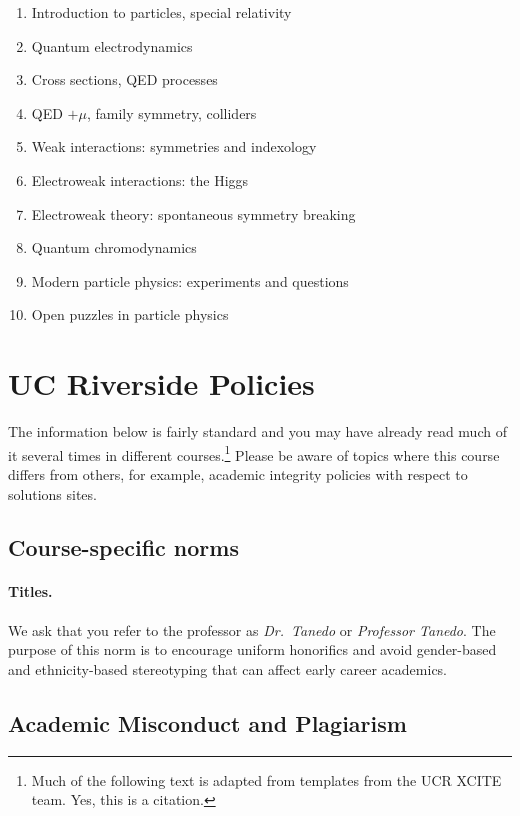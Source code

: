 \documentclass[12pt]{article}
\newcommand\acro[1]{{\small {#1}}}
\numberwithin{equation}{section}    %
\begin{document}
\begin{enumerate}
	\item Introduction to particles, special relativity
	\item Quantum electrodynamics
	\item Cross sections, QED processes
	\item QED $+ \mu$, family symmetry, colliders
	\item Weak interactions: symmetries and indexology
	\item Electroweak interactions: the Higgs
	\item Electroweak theory: spontaneous symmetry breaking
	\item Quantum chromodynamics
	\item Modern particle physics: experiments and questions
	\item Open puzzles in particle physics
\end{enumerate}




\section{UC Riverside Policies}

The information below is fairly standard and you may have already read much of it several times in different courses.\footnote{Much of the following text is adapted from templates from the \acro{UCR XCITE} team. Yes, this is a citation.} Please be aware of topics where this course differs from others, for example, academic integrity policies with respect to solutions sites. 

\subsection{Course-specific norms}

\paragraph{Titles.} We ask that you refer to the professor as \emph{Dr.~Tanedo} or \emph{Professor Tanedo}. The purpose of this norm is to encourage uniform honorifics and avoid gender-based and ethnicity-based stereotyping that can affect early career academics.

\subsection{Academic Misconduct and Plagiarism}
\end{document}
